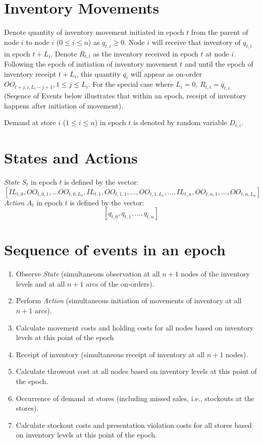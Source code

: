 \documentclass[12pt]{amsart}
\begin{document}
\section{Inventory Movements}
Denote quantity of inventory movement initiated in epoch $t$ from the parent of node $i$ to node $i$ ($0 \leq i \leq n$) as $q_{t,i} \geq 0$. Node $i$ will receive that inventory of $q_{t,i}$ in epoch $t + L_i$. Denote $R_{t,i}$ as the inventory received in epoch $t$ at node $i$. Following the epoch of initiation of inventory movement $t$ and until the epoch of inventory receipt $t + L_i$, this quantity $q_i$ will appear as on-order $OO_{t+j,i,L_i-j+1}, 1 \leq j \leq L_i$. For the special case where $L_i = 0$, $R_{t,i} = q_{t,i}$ (Seqence of Events below illustrates that within an epoch, receipt of inventory happens after initiation of movement).

Demand at store $i$ ($1 \leq i \leq n$) in epoch $t$ is denoted by random variable $D_{t,i}$.

\section{States and Actions}
{\em State} $S_t$ in epoch $t$ is defined by the vector:
 $$[IL_{t,0}, OO_{t,0,1}, \ldots OO_{t,0, L_0}, IL_{t,1}, OO_{t,1,1}, \ldots, OO_{t,1,L_1}, \ldots, IL_{t,n}, OO_{t,n,1}, \dots, OO_{t,n, L_n}]$$
 {\em Action} $A_t$ in epoch $t$ is defined by the vector:
 $$[q_{t,0}, q_{t,1}, \ldots, q_{t,n}]$$


\section{Sequence of events in an epoch}

\begin{enumerate}
\item Observe {\em State} (simultaneous observation at all $n+1$ nodes of the inventory levels and at all $n+1$ arcs of the on-orders).
\item Perform {\em Action} (simultaneous initiation of movements of inventory at all $n+1$ arcs).
\item Calculate movement costs and holding costs for all nodes based on inventory levels at this point of the epoch
\item Receipt of inventory (simultaneous receipt of inventory at all $n+1$ nodes).
\item Calculate throwout cost at all nodes based on inventory levels at this point of the epoch. 
\item Occurrence of demand at stores (including missed sales, i.e., stockouts at the stores).
\item Calculate stockout costs and presentation violation costs for all stores based on inventory levels at this point of the epoch.
\end{enumerate}
\end{document}
